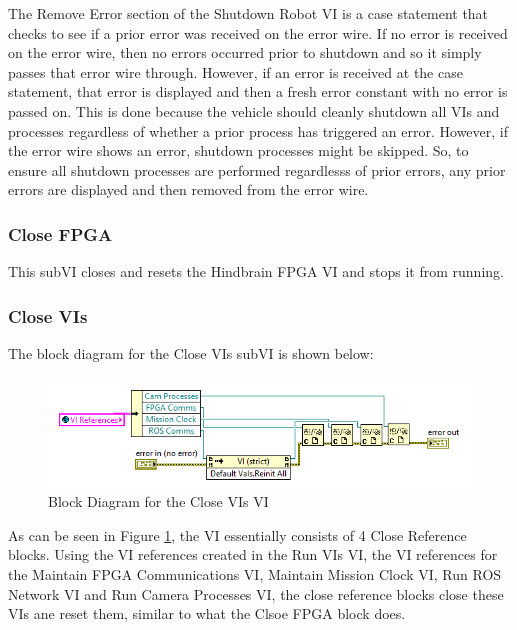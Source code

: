The Remove Error section of the Shutdown Robot VI is a case statement that checks to see if a prior error was received on the error wire. If no error is received on the error wire, then no errors occurred prior to shutdown and so it simply passes that error wire through. However, if an error is received at the case statement, that error is displayed and then a fresh error constant with no error is passed on. This is done because the vehicle should cleanly shutdown all VIs and processes regardless of whether a prior process has triggered an error. However, if the error wire shows an error, shutdown processes might be skipped. So, to ensure all shutdown processes are performed regardlesss of prior errors, any prior errors are displayed and then removed from the error wire.

\subsubsection{Close FPGA}

This subVI closes and resets the Hindbrain FPGA VI and stops it from running.

\subsubsection{Close VIs}

The block diagram for the Close VIs subVI is shown below: 

\begin{figure}[h!]
\centering
\includegraphics[scale=0.85]{Photos/closevis.png}
\caption{Block Diagram for the Close VIs VI}
\label{fig:closevis}
\end{figure}

\noindent As can be seen in Figure \ref{fig:closevis}, the VI essentially consists of 4 Close Reference blocks. Using the VI references created in the Run VIs VI, the VI references for the  Maintain FPGA Communications VI, Maintain Mission Clock VI, Run ROS Network VI and Run Camera Processes VI, the close reference blocks close these VIs ane reset them, similar to what the Clsoe FPGA block does.

\newpage

